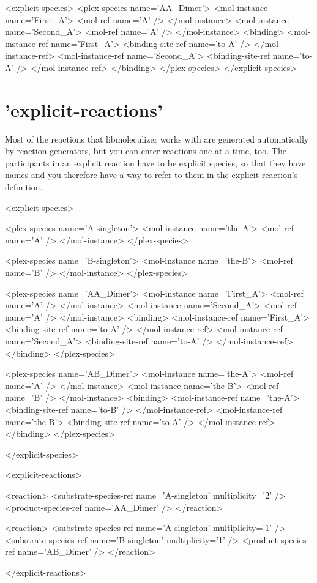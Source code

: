 \begin{ExampleXML}
<explicit-species>
  <plex-species name='AA_Dimer'>
    <mol-instance name='First_A'>
      <mol-ref name='A' />
    </mol-instance>
    <mol-instance name='Second_A'>
      <mol-ref name='A' />
    </mol-instance>
    <binding>
      <mol-instance-ref name='First_A'>
        <binding-site-ref name='to-A' />
      </mol-instance-ref>
      <mol-instance-ref name='Second_A'>
        <binding-site-ref name='to-A' />
      </mol-instance-ref>
    </binding>
  </plex-species>
</explicit-species>
\end{ExampleXML}

\section{'explicit-reactions'}

Most of the reactions that libmoleculizer works with are generated
automatically by reaction generators, but you can enter reactions
one-at-a-time, too. The participants in an explicit reaction have to
be explicit species, so that they have names and you therefore have a
way to refer to them in the explicit reaction's definition. 


\begin{ExampleXML}
<explicit-species>

  <plex-species name='A-singleton'>
    <mol-instance name='the-A'>
      <mol-ref name='A' />
    </mol-instance>
  </plex-species>

  <plex-species name='B-singleton'>
    <mol-instance name='the-B'>
      <mol-ref name='B' />
    </mol-instance>
  </plex-species>

  <plex-species name='AA_Dimer'>
    <mol-instance name='First_A'>
      <mol-ref name='A' />
    </mol-instance>
    <mol-instance name='Second_A'>
      <mol-ref name='A' />
    </mol-instance>
    <binding>
      <mol-instance-ref name='First_A'>
        <binding-site-ref name='to-A' />
      </mol-instance-ref>
      <mol-instance-ref name='Second_A'>
        <binding-site-ref name='to-A' />
      </mol-instance-ref>
    </binding>
  </plex-species>

  <plex-species name='AB_Dimer'>
    <mol-instance name='the-A'>
      <mol-ref name='A' />
    </mol-instance>
    <mol-instance name='the-B'>
      <mol-ref name='B' />
    </mol-instance>
    <binding>
      <mol-instance-ref name='the-A'>
        <binding-site-ref name='to-B' />
      </mol-instance-ref>
      <mol-instance-ref name='the-B'>
        <binding-site-ref name='to-A' />
      </mol-instance-ref>
    </binding>
  </plex-species>

</explicit-species>

<explicit-reactions>

  <reaction>
    <substrate-species-ref name='A-singleton' multiplicity='2' />
    <product-species-ref name='AA_Dimer' />
  </reaction>

  <reaction>
    <substrate-species-ref name='A-singleton' multiplicity='1' />
    <substrate-species-ref name='B-singleton' multiplicity='1' />
    <product-species-ref name='AB_Dimer' />
  </reaction>

</explicit-reactions>  
\end{ExampleXML}

